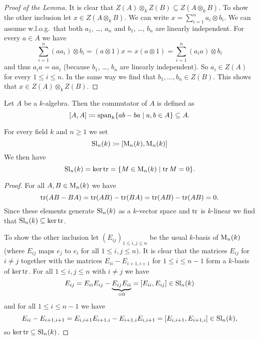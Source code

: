 \begin{proof}[Proof of the Lemma]
 It is clear that $Z(A) \otimes_k Z(B) \subseteq Z(A \otimes_k B)$. To show the other inclusion let $x \in Z(A \otimes_k B)$. We can write $x = \sum_{i=1}^n a_i \otimes b_i$. We can assume w.l.o.g.\ that both $a_1$, \dots, $a_n$ and $b_1$, \dots, $b_n$ are linearly independent. For every $a \in A$ we have
 \[
  \sum_{i=1}^n (a a_i) \otimes b_i
  = (a \otimes 1) x
  = x (a \otimes 1)
  = \sum_{i=1}^n (a_i a) \otimes b_i
 \]
 and thus $a_i a = a a_i$ (because $b_1$, \dots, $b_n$ are linearly independent). So $a_i \in Z(A)$ for every $1 \leq i \leq n$. In the same way we find that $b_1, \dotsc, b_n \in Z(B)$. This shows that $x \in Z(A) \otimes_k Z(B)$.
\end{proof}


\begin{defi}
 Let $A$ be a $k$-algebra. Then the commutator of $A$ is defined as
 \[
  [A,A] \coloneqq \operatorname{span}_k \{ab-ba \mid a,b \in A\} \subseteq A.
 \]
\end{defi}


\begin{expl}
 For every field $k$ and $n \geq 1$ we set
 \[
  \operatorname{Sl}_n(k) \coloneqq [\operatorname{M}_n(k), \operatorname{M}_n(k)]
 \]
 We then have
 \[
  \operatorname{Sl}_n(k) = \ker \operatorname{tr} = \{M \in \operatorname{M}_n(k) \mid \operatorname{tr} M = 0\}.
 \]
 \begin{proof}
  For all $A, B \in \operatorname{M}_n(k)$ we have
  \[
   \operatorname{tr}(AB-BA) = \operatorname{tr}(AB)-\operatorname{tr}(BA) = \operatorname{tr}(AB)-\operatorname{tr}(AB) = 0.
  \]
  Since these elements generate $\operatorname{Sl}_n(k)$ as a $k$-vector space and $\operatorname{tr}$ is $k$-linear we find that $\operatorname{Sl}_n(k) \subseteq \ker \operatorname{tr}$.
  
  To show the other inclusion let $(E_{ij})_{1 \leq i,j \leq n}$ be the usual $k$-basis of $\operatorname{M}_n(k)$ (where $E_{ij}$ maps $e_j$ to $e_i$ for all $1 \leq i,j \leq n)$. It is clear that the matrices $E_{ij}$ for $i \neq j$ together with the matrices $E_{ii}-E_{i+1,i+1}$ for $1 \leq i \leq n-1$ form a $k$-basis of $\ker \operatorname{tr}$. For all $1 \leq i,j \leq n$ with $i \neq j$ we have
  \[
   E_{ij} = E_{ii} E_{ij} - \underbrace{E_{ij} E_{ii}}_{=0} = [E_{ii}, E_{ij}] \in \operatorname{Sl}_n(k)
  \]
  and for all $1 \leq i \leq n-1$ we have
  \[
   E_{ii} - E_{i+1,i+1} = E_{i,i+1} E_{i+1,i} - E_{i+1,i} E_{i,i+1} = [E_{i,i+1}, E_{i+1,i}] \in \operatorname{Sl}_n(k),
  \]
  so $\ker \operatorname{tr} \subseteq \operatorname{Sl}_n(k)$.
 \end{proof}
\end{expl}


